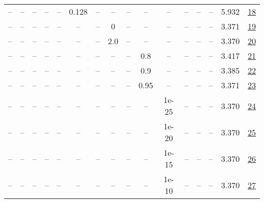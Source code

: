 \begin{table}[H]
\begin{tabular}{cccccccccccccccc}
-- & -- & -- & -- & -- & 0.128 & -- & -- & -- & -- & -- & -- & -- & -- & 5.932 & \href{https://wandb.ai/stanford-mercury/optimizer-scaling/runs/sweep-130m-5B-muoncd7567lr0.128-wd0.1-minlr0-warmup0-b10.8-b20.9-94d384}{18} \\
-- & -- & -- & -- & -- & -- & -- & 0 & -- & -- & -- & -- & -- & -- & 3.371 & \href{https://wandb.ai/stanford-mercury/optimizer-scaling/runs/sweep-130m-5B-muon62146clr0.008-wd0.1-minlr0-warmup0-b10.8-b20.9-272d38}{19} \\
-- & -- & -- & -- & -- & -- & -- & 2.0 & -- & -- & -- & -- & -- & -- & 3.370 & \href{https://wandb.ai/stanford-mercury/optimizer-scaling/runs/sweep-130m-5B-muon56bcb9lr0.008-wd0.1-minlr0-warmup0-b10.8-b20.9-458d8a}{20} \\
-- & -- & -- & -- & -- & -- & -- & -- & -- & 0.8 & -- & -- & -- & -- & 3.417 & \href{https://wandb.ai/stanford-mercury/optimizer-scaling/runs/sweep-130m-5B-muon2bb145lr0.008-wd0.1-minlr0-warmup0-b10.8-b20.9-853273}{21} \\
-- & -- & -- & -- & -- & -- & -- & -- & -- & 0.9 & -- & -- & -- & -- & 3.385 & \href{https://wandb.ai/stanford-mercury/optimizer-scaling/runs/sweep-130m-5B-muon1e4ecflr0.008-wd0.1-minlr0-warmup0-b10.8-b20.9-879792}{22} \\
-- & -- & -- & -- & -- & -- & -- & -- & -- & 0.95 & -- & -- & -- & -- & 3.371 & \href{https://wandb.ai/stanford-mercury/optimizer-scaling/runs/sweep-130m-5B-muon4d5315lr0.008-wd0.1-minlr0-warmup0-b10.8-b20.9-d3e612}{23} \\
-- & -- & -- & -- & -- & -- & -- & -- & -- & -- & 1e-25 & -- & -- & -- & 3.370 & \href{https://wandb.ai/stanford-mercury/optimizer-scaling/runs/sweep-130m-5B-muon7e15a1lr0.008-wd0.1-minlr0-warmup0-b10.8-b20.9-0132f8}{24} \\
-- & -- & -- & -- & -- & -- & -- & -- & -- & -- & 1e-20 & -- & -- & -- & 3.370 & \href{https://wandb.ai/stanford-mercury/optimizer-scaling/runs/sweep-130m-5B-muona85b5alr0.008-wd0.1-minlr0-warmup0-b10.8-b20.9-c272e7}{25} \\
-- & -- & -- & -- & -- & -- & -- & -- & -- & -- & 1e-15 & -- & -- & -- & 3.370 & \href{https://wandb.ai/stanford-mercury/optimizer-scaling/runs/sweep-130m-5B-muonf5b405lr0.008-wd0.1-minlr0-warmup0-b10.8-b20.9-bd4ae9}{26} \\
-- & -- & -- & -- & -- & -- & -- & -- & -- & -- & 1e-10 & -- & -- & -- & 3.370 & \href{https://wandb.ai/stanford-mercury/optimizer-scaling/runs/sweep-130m-5B-muon90526elr0.008-wd0.1-minlr0-warmup0-b10.8-b20.9-316987}{27} \\

\end{tabular}
\end{table}
